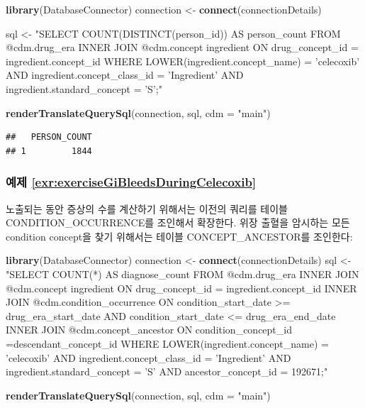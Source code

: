 \documentclass[10.5pt]{book}
\newenvironment{Shaded}{\begin{snugshade}}{\end{snugshade}}
\newcommand{\KeywordTok}[1]{\textcolor[rgb]{0.13,0.29,0.53}{\textbf{#1}}}
\newcommand{\DataTypeTok}[1]{\textcolor[rgb]{0.13,0.29,0.53}{#1}}
\newcommand{\StringTok}[1]{\textcolor[rgb]{0.31,0.60,0.02}{#1}}
\newcommand{\NormalTok}[1]{#1}
\theoremstyle{definition}
\theoremstyle{definition}
\theoremstyle{definition}
\theoremstyle{remark}
\begin{document}
\begin{Shaded}
\begin{Highlighting}[]
\KeywordTok{library}\NormalTok{(DatabaseConnector)}
\NormalTok{connection <-}\StringTok{ }\KeywordTok{connect}\NormalTok{(connectionDetails)}

\NormalTok{sql <-}\StringTok{ "SELECT COUNT(DISTINCT(person_id)) AS person_count}
\StringTok{FROM @cdm.drug_era}
\StringTok{INNER JOIN @cdm.concept ingredient}
\StringTok{  ON drug_concept_id = ingredient.concept_id}
\StringTok{WHERE LOWER(ingredient.concept_name) = 'celecoxib'}
\StringTok{  AND ingredient.concept_class_id = 'Ingredient'}
\StringTok{  AND ingredient.standard_concept = 'S';"}

\KeywordTok{renderTranslateQuerySql}\NormalTok{(connection, sql, }\DataTypeTok{cdm =} \StringTok{"main"}\NormalTok{)}
\end{Highlighting}
\end{Shaded}

\begin{verbatim}
##   PERSON_COUNT
## 1         1844
\end{verbatim}

\subsubsection*{예제
\ref{exr:exerciseGiBleedsDuringCelecoxib}}\label{-refexrexercisegibleedsduringcelecoxib}

노출되는 동안 증상의 수를 계산하기 위해서는 이전의 쿼리를 테이블
CONDITION\_OCCURRENCE를 조인해서 확장한다. 위장 출혈을 암시하는 모든
condition concept을 찾기 위해서는 테이블 CONCEPT\_ANCESTOR를 조인한다:

\begin{Shaded}
\begin{Highlighting}[]
\KeywordTok{library}\NormalTok{(DatabaseConnector)}
\NormalTok{connection <-}\StringTok{ }\KeywordTok{connect}\NormalTok{(connectionDetails)}
\NormalTok{sql <-}\StringTok{ "SELECT COUNT(*) AS diagnose_count}
\StringTok{FROM @cdm.drug_era}
\StringTok{INNER JOIN @cdm.concept ingredient}
\StringTok{  ON drug_concept_id = ingredient.concept_id}
\StringTok{INNER JOIN @cdm.condition_occurrence}
\StringTok{  ON condition_start_date >= drug_era_start_date}
\StringTok{    AND condition_start_date <= drug_era_end_date}
\StringTok{INNER JOIN @cdm.concept_ancestor }
\StringTok{  ON condition_concept_id =descendant_concept_id}
\StringTok{WHERE LOWER(ingredient.concept_name) = 'celecoxib'}
\StringTok{  AND ingredient.concept_class_id = 'Ingredient'}
\StringTok{  AND ingredient.standard_concept = 'S'}
\StringTok{  AND ancestor_concept_id = 192671;"}

\KeywordTok{renderTranslateQuerySql}\NormalTok{(connection, sql, }\DataTypeTok{cdm =} \StringTok{"main"}\NormalTok{)}
\end{Highlighting}
\end{Shaded}
\end{document}
